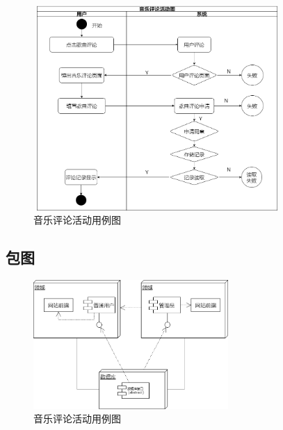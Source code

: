\documentclass[UTF8,14pt]{article}
\numberwithin{figure}{subsubsection}
\numberwithin{table}{subsubsection}
\begin{document}
\vspace*{-1cm}
\begin{figure}[H]
	\centering
	\includegraphics[width=9.41cm,height=7.8cm]{用例图3.png}
	\caption{音乐评论活动用例图}
\end{figure}

\subsection{包图}
\begin{figure}[H]
	\centering
	\includegraphics[width=7.41cm,height=4.91cm]{包图.png}
	\caption{音乐评论活动用例图}
\end{figure}
\end{document}
